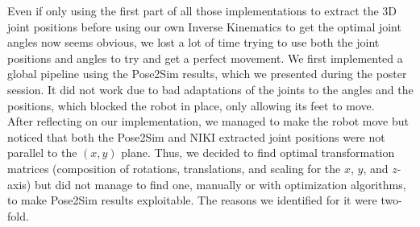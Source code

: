 \documentclass{amsart}
\theoremstyle{definition}
\theoremstyle{plain}
\begin{document}
Even if only using the first part of all those implementations to extract the 3D joint positions before using our own Inverse Kinematics to get the optimal joint angles now seems obvious, we lost a lot of time trying to use both the joint positions and angles to try and get a perfect movement. We first implemented a global pipeline using the Pose2Sim results, which we presented during the poster session. It did not work due to bad adaptations of the joints to the angles and the positions, which blocked the robot in place, only allowing its feet to move. \\

After reflecting on our implementation, we managed to make the robot move but noticed that both the Pose2Sim and NIKI extracted joint positions were not parallel to the $(x, y)$ plane. Thus, we decided to find optimal transformation matrices (composition of rotations, translations, and scaling for the $x$, $y$, and $z$-axis) but did not manage to find one, manually or with optimization algorithms, to make Pose2Sim results exploitable. The reasons we identified for it were two-fold.
\end{document}
